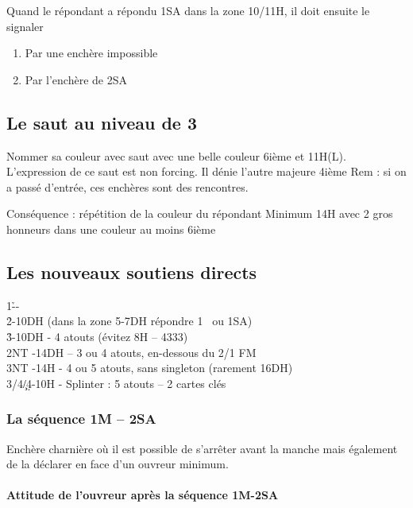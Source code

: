 \documentclass[a4paper]{article}
\begin{document}
Quand le répondant a répondu 1SA dans la zone 10/11H, il doit ensuite 
le signaler

\begin{enumerate}
\item Par une enchère impossible

\item Par l’enchère de 2SA

\end{enumerate}

\subsection{Le saut au niveau de 3}

Nommer sa couleur avec saut avec une belle couleur 6ième et 11H(L). 
L’expression de ce saut est non forcing. Il dénie l’autre majeure 4ième
Rem : si on a passé d’entrée, ces enchères sont des rencontres.

Conséquence : répétition de la couleur du répondant
Minimum 14H avec 2 gros honneurs dans une couleur au moins 6ième

\subsection{Les nouveaux soutiens directs}

\begin{bidtable}
1\h--\\
2\h {}-10DH (dans la zone 5-7DH répondre 1 \s\ ou 1SA)\\
3\h {}-10DH - 4 atouts (évitez 8H – 4333)\\
2NT -14DH – 3 ou 4 atouts, en-dessous du 2/1 FM\\
3NT -14H - 4 ou 5 atouts, sans singleton (rarement 16DH)\\
3\s/4\c/4\d {}-10H - Splinter : 5 atouts – 2 cartes clés
\end{bidtable}

\subsubsection{La séquence 1M – 2SA}

Enchère charnière où il est possible de s’arrêter avant la manche mais également de la déclarer en 
face d’un ouvreur minimum.

\paragraph{Attitude de l’ouvreur après la séquence 1M-2SA}
\end{document}
